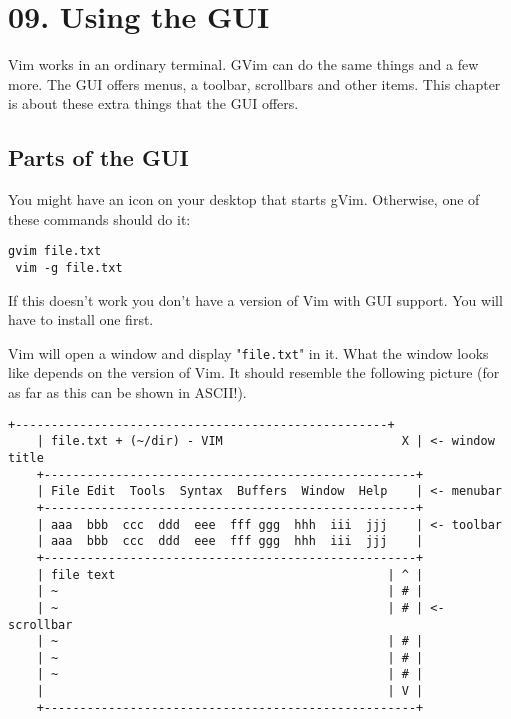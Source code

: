 \section{09. Using the GUI}
Vim works in an ordinary terminal.  GVim can do the same things and a few
more.  The GUI offers menus, a toolbar, scrollbars and other items.  This
chapter is about these extra things that the GUI offers.
\localtableofcontents
\subsection{Parts of the GUI}

You might have an icon on your desktop that starts gVim.
Otherwise, one of these commands should do it:

 \begin{Verbatim}[samepage=true]
 gvim file.txt
 vim -g file.txt
 \end{Verbatim}

If this doesn't work you don't have a version of Vim with GUI support.
You will have to install one first.

Vim will open a window and display "\texttt{file.txt}" in it.
What the window looks like depends on the version of Vim.
It should resemble the following picture (for as far as this can be shown in ASCII!).

\begin{Verbatim}[samepage=true]
    +----------------------------------------------------+
    | file.txt + (~/dir) - VIM                         X | <- window title
    +----------------------------------------------------+
    | File Edit  Tools  Syntax  Buffers  Window  Help    | <- menubar
    +----------------------------------------------------+
    | aaa  bbb  ccc  ddd  eee  fff ggg  hhh  iii  jjj    | <- toolbar
    | aaa  bbb  ccc  ddd  eee  fff ggg  hhh  iii  jjj    |
    +----------------------------------------------------+
    | file text                                      | ^ |
    | ~                                              | # |
    | ~                                              | # | <- scrollbar
    | ~                                              | # |
    | ~                                              | # |
    | ~                                              | # |
    |                                                | V |
    +----------------------------------------------------+
\end{Verbatim}

